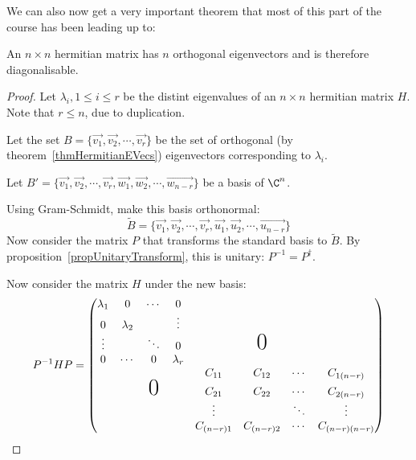 \documentclass[../Main.tex]{subfiles}
\begin{document}
We can also now get a very important theorem that most of this part of the course has been leading up to:
\begin{theorem}
    An $n \times n$ hermitian matrix has $n$ orthogonal eigenvectors and is therefore diagonalisable.
    \label{thmHermitianEVecsN}
\end{theorem}
\begin{proof}
    Let $\lambda_i, 1 \leq i \leq r$ be the distint eigenvalues of an $n \times n$ hermitian matrix $H$. Note that $r \leq n$, due to duplication.\par
    Let the set $B = \{\vec{v_1}, \vec{v_2}, \cdots, \vec{v_r}\}$ be the set of orthogonal (by theorem~\ref{thmHermitianEVecs}) eigenvectors corresponding to $\lambda_i$.\par
    Let $B' = \{\vec{v_1}, \vec{v_2}, \cdots, \vec{v_r}, \vec{w_1}, \vec{w_2}, \cdots, \vec{w_{n-r}}\}$ be a basis of $\C^n$.\par
    Using Gram-Schmidt, make this basis orthonormal:
    \begin{equation*}
        \tilde{B} = \{\vec{v_1}, \vec{v_2}, \cdots, \vec{v_r}, \vec{u_1}, \vec{u_2}, \cdots, \vec{u_{n-r}}\}
    \end{equation*}
    Now consider the matrix $P$ that transforms the standard basis to $\tilde{B}$. By proposition~\ref{propUnitaryTransform}, this is unitary: $P^{-1} = P^\dagger$.\par
    Now consider the matrix $H$ under the new basis:
    \begin{equation*}
        P^{-1} H P =
        \begin{pmatrix}
            \lambda_1 & 0 & \cdots & 0 & & & & \\
            0 & \lambda_2 & & \vdots & & & & \\
            \vdots & & \ddots & 0 & & \text{\huge{0}} & & \\
            0 & \cdots & 0 & \lambda_r & & & & \\
            & & & & C_{11} & C_{12} & \cdots & C_{1(n-r)} \\
            & & \text{\huge{0}} & & C_{21} & C_{22} & \cdots & C_{2(n-r)} \\
            & & & & \vdots & & \ddots & \vdots \\
            & & & & C_{(n-r)1} & C_{(n-r)2} & \cdots & C_{(n-r)(n-r)} 
        \end{pmatrix}
    \end{equation*}
\end{proof}
\end{document}
